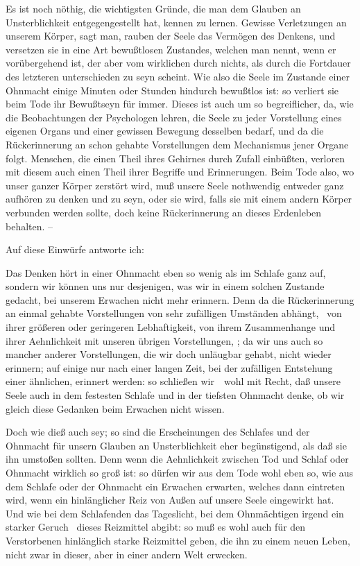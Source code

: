 \begin{RWanm}
Es ist noch nöthig, die wichtigsten Gründe, die man dem Glauben an Unsterblichkeit entgegengestellt hat, kennen zu lernen. Gewisse Verletzungen an unserem Körper, sagt man, rauben der Seele das Vermögen des Denkens, und versetzen sie in eine Art bewußtlosen Zustandes, welchen man  nennt, wenn er vorübergehend ist, der aber vom wirklichen  durch nichts, als durch die Fortdauer des letzteren unterschieden zu seyn scheint. Wie also die Seele im Zustande einer Ohnmacht einige Minuten oder Stunden hindurch bewußtlos ist: so verliert sie beim Tode ihr Bewußtseyn für immer. Dieses ist auch um so begreiflicher, da, wie die Beobachtungen der Psychologen lehren, die Seele zu jeder Vorstellung eines eigenen Organs und einer gewissen Bewegung desselben bedarf, und da die Rückerinnerung an schon gehabte Vorstellungen dem Mechanismus jener Organe folgt. Menschen, die einen Theil ihres Gehirnes durch Zufall einbüßten, verloren mit diesem auch einen Theil ihrer Begriffe und Erinnerungen. Beim Tode also, wo unser ganzer Körper zerstört wird, muß unsere Seele nothwendig entweder ganz aufhören zu denken und zu seyn, oder sie wird, falls sie mit einem andern Körper verbunden werden sollte, doch keine Rückerinnerung an dieses Erdenleben behalten. -- \par
Auf diese Einwürfe antworte ich:\par
\begin{aufza}
\item Das Denken hört in einer Ohnmacht eben so wenig als im Schlafe ganz auf, sondern wir können uns nur desjenigen, was wir in einem solchen Zustande gedacht, bei unserem Erwachen nicht mehr erinnern. Denn da die Rückerinnerung an einmal gehabte Vorstellungen von sehr zufälligen Umständen abhängt, \zB\ von ihrer größeren oder geringeren Lebhaftigkeit, von ihrem Zusammenhange und ihrer Aehnlichkeit mit unseren übrigen Vorstellungen, \usw ; da wir uns auch so mancher anderer Vorstellungen, die wir doch unläugbar gehabt, nicht wieder erinnern; auf einige nur nach einer langen Zeit, bei der zufälligen Entstehung einer ähnlichen, erinnert werden: so schließen wir~\ wohl mit Recht, daß unsere Seele auch in dem festesten Schlafe und in der tiefsten Ohnmacht denke, ob wir gleich diese Gedanken beim Erwachen nicht wissen.
\item Doch wie dieß auch sey; so sind die Erscheinungen des Schlafes und der Ohnmacht für unsern Glauben an Unsterblichkeit eher begünstigend, als daß sie ihn umstoßen sollten. Denn wenn die Aehnlichkeit zwischen Tod und Schlaf oder Ohnmacht wirklich so groß ist: so dürfen wir aus dem Tode wohl eben so, wie aus dem Schlafe oder der Ohnmacht ein Erwachen erwarten, welches dann eintreten wird, wenn ein hinlänglicher Reiz von Außen auf unsere Seele eingewirkt hat. Und wie bei dem Schlafenden das Tageslicht, bei dem Ohnmächtigen irgend ein starker Geruch \udgl\ dieses Reizmittel abgibt: so muß es wohl auch für den Verstorbenen hinlänglich starke Reizmittel geben, die ihn zu einem neuen Leben, nicht zwar in dieser, aber in einer andern Welt erwecken.

\end{aufza}
\end{RWanm}
